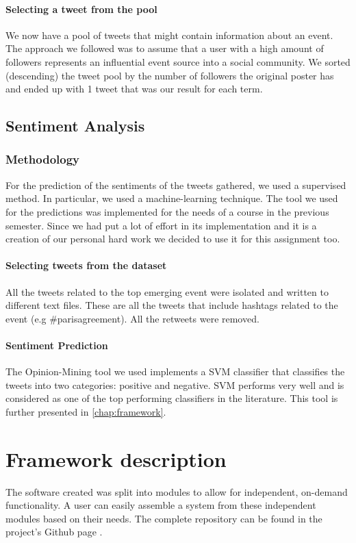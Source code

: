 \documentclass[12pt,svgnames]{report}
\begin{document}
\subsubsection*{Selecting a tweet from the pool}
We now have a pool of tweets that might contain information about an event. The approach we followed was to assume that a user with a high amount of followers represents an influential event source  into a social community\cite{cataldi2013personalized}. We sorted (descending) the tweet pool by the number of followers the original poster has and ended up with 1 tweet that was our result for each term.
\section*{Sentiment Analysis}

\subsection*{Methodology}
For the prediction of the sentiments of the tweets gathered, we used a supervised method. In particular, we used a machine-learning technique. The tool we used for the predictions was implemented for the needs of a course in the previous semester. Since we had put a lot of effort in its implementation and it is a creation of our personal hard work we decided to use it for this assignment too.

\subsubsection*{Selecting tweets from the dataset}
All the tweets related to the top emerging event were isolated and written to different text files. These are all the tweets that include hashtags related to the event (e.g \#parisagreement). All the retweets  were removed. 

\subsubsection*{Sentiment Prediction}
The Opinion-Mining tool\cite{opinion} we used implements a SVM classifier that classifies the tweets into two categories: positive and negative. SVM performs very well and is considered as one of the top performing classifiers in the literature. This tool is further presented in \autoref{chap:framework}.

\chapter{Framework description}
\label{chap:framework}
The software created was split into modules to allow for independent, on-demand functionality. A user can easily assemble a system from these independent modules based on their needs. The complete repository can be found in the project's Github page \cite{projectgithub}.
\end{document}
